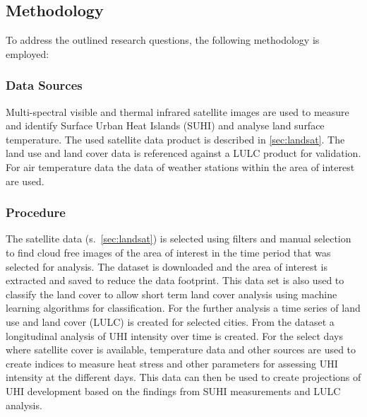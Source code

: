 \documentclass[12pt,a4paper, english,twoside]{article}
\begin{document}
 \subsection{Methodology}\label{sec:methodology}
  To address the outlined research questions, the following methodology is employed:
  \subsubsection{Data Sources}\label{ssec:datasources} 
    Multi-spectral visible and thermal infrared satellite images are used to measure and identify Surface Urban Heat Islands (SUHI) and analyse land surface temperature. 
    The used satellite data product is described in \cref{sec:landsat}.
    The land use and land cover data is referenced against a LULC product for validation.\\ %
    For air temperature data the data of weather stations within the area of interest are used.
    \subsubsection{Procedure}\label{ssec:procedure} 
    The satellite data (s.~\cref{sec:landsat}) is selected using filters and manual selection to find cloud free images of the area of interest in the time period that was selected for analysis. 
    The dataset is downloaded and the area of interest is extracted and saved to reduce the data footprint.
    This data set is also used to classify the land cover to allow short term land cover analysis using machine learning algorithms for classification.
    For the further analysis a time series of land use and land cover (LULC) is created for selected cities. %
    From the dataset a longitudinal analysis of UHI intensity over time is created.
    For the select days where satellite cover is available, temperature data and other sources are used to create indices to measure heat stress and other parameters for assessing UHI intensity at the different days.
    This data can then be used to create projections of UHI development based on the findings from \gls{SUHI} measurements and \gls{LULC} analysis.
\end{document}
